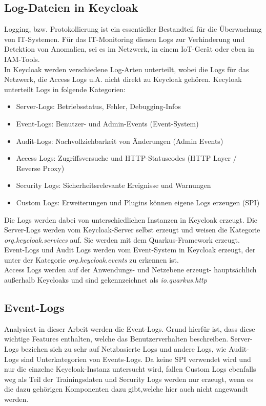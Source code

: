 \documentclass[a4paper,12pt]{article}
\begin{document}
	\subsection{Log-Dateien in Keycloak}
	Logging, bzw. Protokollierung ist ein essentieller Bestandteil für die Überwachung von IT-Systemen. Für das IT-Monitoring dienen Logs zur Verhinderung und Detektion von Anomalien, sei es im Netzwerk, in einem IoT-Gerät oder eben in IAM-Tools. 
	\\[0.5em]
	In Keycloak werden verschiedene Log-Arten unterteilt, wobei die Logs für das Netzwerk, die Access Logs u.A. nicht direkt zu Keycloak gehören.
	Kecyloak unterteilt Logs in folgende Kategorien:
	\begin{itemize}
		\item Server-Logs: Betriebsstatus, Fehler, Debugging-Infos
		\item Event-Logs: Benutzer- und Admin-Events (Event-System)
		\item Audit-Logs: Nachvollziehbarkeit von Änderungen (Admin Events)
		\item Access Logs: Zugriffsversuche und HTTP-Statuscodes (HTTP Layer / Reverse Proxy)
		\item Security Logs: Sicherheitsrelevante Ereignisse und Warnungen
		\item Custom Logs: Erweiterungen und Plugins können eigene Logs erzeugen (SPI)
	\end{itemize}
	Die Logs werden dabei von unterschiedlichen Instanzen in Keycloak erzeugt. Die Server-Logs werden  vom Keycloak-Server selbst erzeugt und weisen die Kategorie \textit{org.keycloak.services} auf. Sie werden mit dem Quarkus-Framework erzeugt.
	\\[0.5em]
	Event-Logs und Audit Logs werden vom Event-System in Keycloak erzeugt, der unter der Kategorie \textit{org.keycloak.events} zu erkennen ist.
	\\[0.5em]
	Access Logs werden auf der Anwendungs- und Netzebene erzeugt- hauptsächlich außerhalb Keycloaks und sind gekennzeichnet als \textit{io.quarkus.http}
	\\[0.5em]
	
	\subsection{Event-Logs}
	Analysiert in dieser Arbeit werden die Event-Logs. Grund hierfür ist, dass diese wichtige Features enthalten, welche das Benutzerverhalten beschreiben. Server-Logs beziehen sich zu sehr auf Netzbasierte Logs und andere Logs, wie Audit-Logs sind Unterkategorien von Events-Logs. Da keine SPI verwendet wird und nur die einzelne Keycloak-Instanz untersucht wird, fallen Custom Logs ebenfalls weg als Teil der Trainingsdaten und Security Logs werden nur erzeugt, wenn es die dazu gehörigen Komponenten dazu gibt,welche hier auch nicht angewandt werden.
	\\[0.5em]
	
\end{document}
